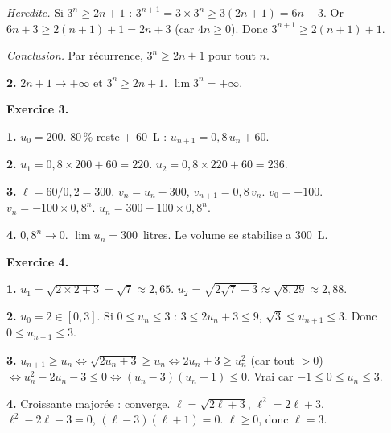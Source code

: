 \textit{Heredite.} Si $3^n \geq 2n+1$ : $3^{n+1} = 3 \times 3^n \geq 3(2n+1) = 6n + 3$. Or $6n + 3 \geq 2(n+1) + 1 = 2n + 3$ (car $4n \geq 0$). Donc $3^{n+1} \geq 2(n+1)+1$.

\textit{Conclusion.} Par récurrence, $3^n \geq 2n+1$ pour tout $n$.

\textbf{2.} $2n+1 \to +\infty$ et $3^n \geq 2n+1$. $\boxed{\lim 3^n = +\infty}$.

\bigskip


\textbf{Exercice 3.}

\textbf{1.} $u_0 = 200$. $80\,\%$ reste + $60$~L : $u_{n+1} = 0{,}8\,u_n + 60$.

\textbf{2.} $u_1 = 0{,}8 \times 200 + 60 = 220$. $u_2 = 0{,}8 \times 220 + 60 = 236$.

\textbf{3.} $\ell = 60/0{,}2 = 300$. $v_n = u_n - 300$, $v_{n+1} = 0{,}8\,v_n$. $v_0 = -100$. $v_n = -100 \times 0{,}8^n$. $u_n = 300 - 100 \times 0{,}8^n$.

\textbf{4.} $0{,}8^n \to 0$. $\lim u_n = \boxed{300}$~litres. Le volume se stabilise a $300$~L.

\bigskip


\textbf{Exercice 4.}

\textbf{1.} $u_1 = \sqrt{2 \times 2 + 3} = \sqrt{7} \approx 2{,}65$. $u_2 = \sqrt{2\sqrt{7}+3} \approx \sqrt{8{,}29} \approx 2{,}88$.

\textbf{2.} $u_0 = 2 \in [0, 3]$. Si $0 \leq u_n \leq 3$ : $3 \leq 2u_n+3 \leq 9$, $\sqrt{3} \leq u_{n+1} \leq 3$. Donc $0 \leq u_{n+1} \leq 3$.

\textbf{3.} $u_{n+1} \geq u_n \iff \sqrt{2u_n+3} \geq u_n \iff 2u_n+3 \geq u_n^2$ (car tout $> 0$) $\iff u_n^2 - 2u_n - 3 \leq 0 \iff (u_n-3)(u_n+1) \leq 0$. Vrai car $-1 \leq 0 \leq u_n \leq 3$.

\textbf{4.} Croissante majorée : converge. $\ell = \sqrt{2\ell+3}$, $\ell^2 = 2\ell+3$, $\ell^2 - 2\ell - 3 = 0$, $(\ell-3)(\ell+1) = 0$. $\ell \geq 0$, donc $\boxed{\ell = 3}$.
